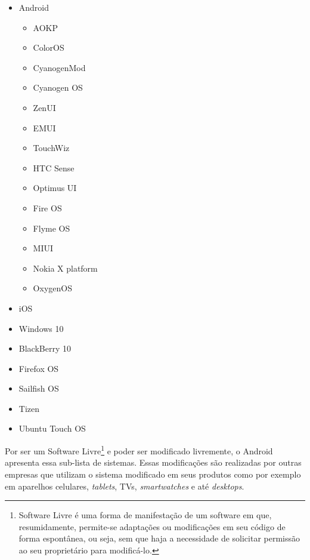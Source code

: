 \begin{footnotesize}
	\begin{itemize}
		\item Android
		\begin{itemize}
			\item AOKP
		    \item ColorOS
		    \item CyanogenMod
		    \item Cyanogen OS
		    \item ZenUI
		    \item EMUI
		    \item TouchWiz
		    \item HTC Sense
		    \item Optimus UI
		    \item Fire OS
		    \item Flyme OS
		    \item MIUI
		    \item Nokia X platform
		    \item OxygenOS
		\end{itemize}
	  	\item iOS
		\item Windows 10
		\item BlackBerry 10
		\item Firefox OS
		\item Sailfish OS
		\item Tizen
		\item Ubuntu Touch OS
	\end{itemize}
\end{footnotesize}

Por ser um Software Livre\footnote{Software Livre é uma forma de manifestação de um software em que, resumidamente, permite-se adaptações ou modificações em seu código de forma espontânea, ou seja, sem que haja a necessidade de solicitar permissão ao seu proprietário para modificá-lo.} e poder ser modificado livremente, o Android apresenta essa sub-lista de sistemas. Essas modificações são realizadas por outras empresas que utilizam o sistema modificado em seus produtos como por exemplo em aparelhos celulares, \textit{tablets}, TVs, \textit{smartwatches} e até \textit{desktops}.